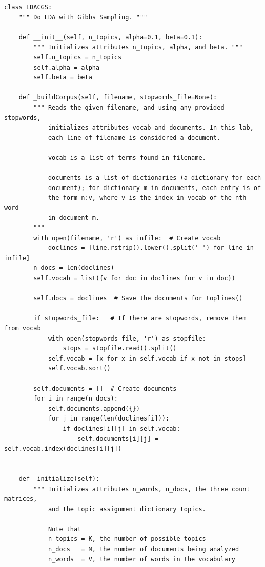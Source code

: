 \begin{lstlisting}
class LDACGS:
    """ Do LDA with Gibbs Sampling. """

    def __init__(self, n_topics, alpha=0.1, beta=0.1):
        """ Initializes attributes n_topics, alpha, and beta. """
        self.n_topics = n_topics
        self.alpha = alpha
        self.beta = beta

    def _buildCorpus(self, filename, stopwords_file=None):
        """ Reads the given filename, and using any provided stopwords,
            initializes attributes vocab and documents. In this lab,
            each line of filename is considered a document.

            vocab is a list of terms found in filename.

            documents is a list of dictionaries (a dictionary for each
            document); for dictionary m in documents, each entry is of
            the form n:v, where v is the index in vocab of the nth word
            in document m.
        """
        with open(filename, 'r') as infile:  # Create vocab
            doclines = [line.rstrip().lower().split(' ') for line in infile]
        n_docs = len(doclines)
        self.vocab = list({v for doc in doclines for v in doc})

        self.docs = doclines  # Save the documents for toplines()

        if stopwords_file:   # If there are stopwords, remove them from vocab
            with open(stopwords_file, 'r') as stopfile:
                stops = stopfile.read().split()
            self.vocab = [x for x in self.vocab if x not in stops]
            self.vocab.sort()

        self.documents = []  # Create documents
        for i in range(n_docs):
            self.documents.append({})
            for j in range(len(doclines[i])):
                if doclines[i][j] in self.vocab:
                    self.documents[i][j] = self.vocab.index(doclines[i][j])


    def _initialize(self):
        """ Initializes attributes n_words, n_docs, the three count matrices,
            and the topic assignment dictionary topics.

            Note that
            n_topics = K, the number of possible topics
            n_docs   = M, the number of documents being analyzed
            n_words  = V, the number of words in the vocabulary


\end{lstlisting}
